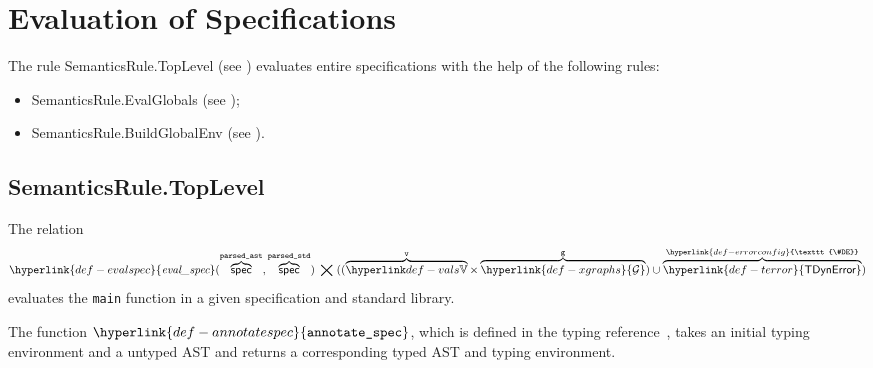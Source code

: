 \documentclass{book}
\newcommand\XGraphs[0]{\hyperlink{def-xgraphs}{\mathcal{G}}}
\newcommand\ErrorConfig[0]{\hyperlink{def-errorconfig}{\texttt{\#DE}}}
\newcommand\TError[0]{\hyperlink{def-terror}{\textsf{TDynError}}}
\newcommand\evalspec[1]{\hyperlink{def-evalspec}{\textfunc{eval\_spec}}(#1)}
\newcommand\parsedstd[0]{\texttt{parsed\_std}}
\newcommand\parsedast[0]{\texttt{parsed\_ast}}
\newcommand\vg[0]{\texttt{g}}
\begin{document}
\chapter{Evaluation of Specifications \label{chap:eval_spec}}
The rule SemanticsRule.TopLevel (see )
evaluates entire specifications with the help of the following rules:
\begin{itemize}
  \item SemanticsRule.EvalGlobals (see );
  \item SemanticsRule.BuildGlobalEnv (see ).
\end{itemize}

\section{SemanticsRule.TopLevel \label{sec:SemanticsRule.TopLevel}}
The relation
\hypertarget{def-evalspec}{}
\[
  \evalspec{\overname{\spec}{\parsedast}, \overname{\spec}{\parsedstd}} \;\aslrel\;
   ((\overname{\vals}{\vv}\times \overname{\XGraphs}{\vg}) \cup \overname{\TError}{\ErrorConfig})
\]
evaluates the \texttt{main} function in a given specification and standard library.

\newcommand\annotatespec[0]{\hyperlink{def-annotatespec}{\texttt{annotate\_spec}}}
\hypertarget{def-annotatespec}{}
The function $\annotatespec$, which is defined in the typing reference~\cite{ASLTypingReference},
takes an initial typing environment and a untyped AST and returns a corresponding typed AST and typing
environment.
\end{document}
